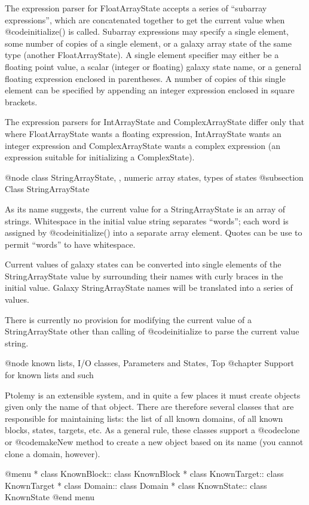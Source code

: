 The expression parser for FloatArrayState accepts a series of ``subarray
expressions'', which are concatenated together to get the current value
when @code{initialize()} is called.  Subarray expressions may specify
a single element, some number of copies of a single element, or a
galaxy array state of the same type (another FloatArrayState).  A
single element specifier may either be a floating point value, a
scalar (integer or floating) galaxy state name, or a general floating
expression enclosed in parentheses.  A number of copies of this
single element can be specified by appending an integer expression
enclosed in square brackets.

The expression parsers for IntArrayState and ComplexArrayState differ
only that where FloatArrayState wants a floating expression,
IntArrayState wants an integer expression and ComplexArrayState
wants a complex expression (an expression suitable for initializing
a ComplexState).

@node class StringArrayState,  , numeric array states, types of states
@subsection Class StringArrayState

As its name suggests, the current value for a StringArrayState is
an array of strings.  Whitespace in the initial value string separates
``words''; each word is assigned by @code{initialize()} into a
separate array element.  Quotes can be use to permit ``words''
to have whitespace.

Current values of galaxy states can be converted into single elements
of the StringArrayState value by surrounding their names with curly
braces in the initial value.  Galaxy StringArrayState names will
be translated into a series of values.

There is currently no provision for modifying the current value of
a StringArrayState other than calling of @code{initialize} to parse
the current value string.

@node known lists, I/O classes, Parameters and States, Top
@chapter Support for known lists and such

Ptolemy is an extensible system, and in quite a few places it must
create objects given only the name of that object.  There are therefore
several classes that are responsible for maintaining lists: the list of
all known domains, of all known blocks, states, targets, etc.  As a
general rule, these classes support a @code{clone} or @code{makeNew}
method to create a new object based on its name (you cannot clone a
domain, however).

@menu
* class KnownBlock::  class KnownBlock
* class KnownTarget::  class KnownTarget
* class Domain::    class Domain
* class KnownState::  class KnownState
@end menu

